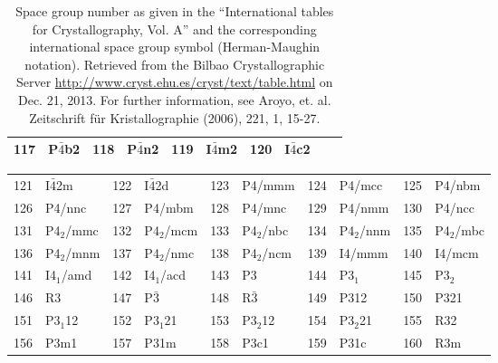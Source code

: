 \documentclass[final,12pt]{article}
\begin{document}
{{{{{{\begin{table}[h!]
\begin{center}
\begin{tabular}{||r|l||r|l||r|l||r|l||r|l||}
117    & P$\bar{4}$b2              & 
118    & P$\bar{4}$n2              & 
119    & I$\bar{4}$m2              & 
120    & I$\bar{4}$c2              \\
\hline
\end{tabular}
\end{center}
\caption{\label{table:spacegroupnumber_a}Space group number as given
  in the ``International tables for Crystallography, Vol. A'' and the
  corresponding international space group symbol (Herman-Maughin
  notation). Retrieved from the Bilbao Crystallographic Server
  \url{http://www.cryst.ehu.es/cryst/text/table.html} on Dec. 21,
  2013.  For further information, see Aroyo, et. al. Zeitschrift f\"ur
  Kristallographie (2006), 221, 1, 15-27.  }
\end{table}


\begin{table}[!h]
\begin{center}
\begin{tabular}{||r|l||r|l||r|l||r|l||r|l||}
\hline
121    & I$\bar{4}$2m              & 
122    & I$\bar{4}$2d              & 
123    & P4/mmm             & 
124    & P4/mcc             & 
125    & P4/nbm             \\
126    & P4/nnc             & 
127    & P4/mbm             & 
128    & P4/mnc             & 
129    & P4/nmm             & 
130    & P4/ncc             \\
131    & P4$_2$/mmc         & 
132    & P4$_2$/mcm         & 
133    & P4$_2$/nbc         & 
134    & P4$_2$/nnm         & 
135    & P4$_2$/mbc         \\
136    & P4$_2$/mnm         & 
137    & P4$_2$/nmc         & 
138    & P4$_2$/ncm         & 
139    & I4/mmm             & 
140    & I4/mcm             \\
141    & I4$_1$/amd         & 
142    & I4$_1$/acd         & 
143    & P3                 & 
144    & P3$_1$             & 
145    & P3$_2$             \\
146    & R3                 & 
147    & P$\bar{3}$         & 
148    & R$\bar{3}$         & 
149    & P312               & 
150    & P321               \\
151    & P3$_1$12           & 
152    & P3$_1$21           & 
153    & P3$_2$12           & 
154    & P3$_2$21           & 
155    & R32                \\
156    & P3m1               & 
157    & P31m               & 
158    & P3c1               & 
159    & P31c               & 
160    & R3m                \\

\end{tabular}
\end{center}
\end{table}}}}}}}
\end{document}
